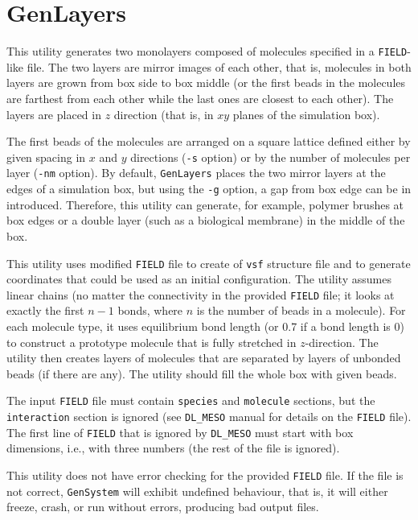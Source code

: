 \section{GenLayers} \label{sec:GenLayers}

This utility generates two monolayers composed of molecules specified in a
\texttt{FIELD}-like file. The two layers are mirror images of each other,
that is, molecules in both layers are grown from box side to box middle (or
the first beads in the molecules are farthest from each other while the
last ones are closest to each other). The layers are placed in $z$
direction (that is, in $xy$ planes of the simulation box).

The first beads of the molecules are arranged on a square lattice defined
either by given spacing in $x$ and $y$ directions (\texttt{-s} option) or
by the number of molecules per layer (\texttt{-nm} option). By default,
\texttt{GenLayers} places the two mirror layers at the edges of a
simulation box, but using the \texttt{-g} option, a gap from box edge can
be in introduced. Therefore, this utility can generate, for example,
polymer brushes at box edges or a double layer (such as a biological
membrane) in the middle of the box.

This utility uses modified \texttt{FIELD} file to create of
\texttt{vsf} structure file and to generate coordinates that could be used
as an initial configuration. The utility assumes linear chains (no matter
the connectivity in the provided \texttt{FIELD} file; it looks at exactly
the first $n-1$ bonds, where $n$ is the number of beads in a molecule). For
each molecule type, it uses equilibrium bond length (or 0.7 if a bond
length is 0) to construct a prototype molecule that is fully stretched in
$z$-direction.  The utility then creates layers of molecules that are
separated by layers of unbonded beads (if there are any). The utility
should fill the whole box with given beads.

The input \texttt{FIELD} file must contain \texttt{species} and
\texttt{molecule} sections, but the \texttt{interaction} section is ignored
(see \texttt{DL\_MESO} manual for details on the \texttt{FIELD} file). The
first line of \texttt{FIELD} that is ignored by \texttt{DL\_MESO} must
start with box dimensions, i.e., with three numbers (the rest of the file
is ignored).

This utility does not have error checking for the provided \texttt{FIELD}
file. If the file is not correct, \texttt{GenSystem} will exhibit
undefined behaviour, that is, it will either freeze, crash, or run without
errors, producing bad output files.

